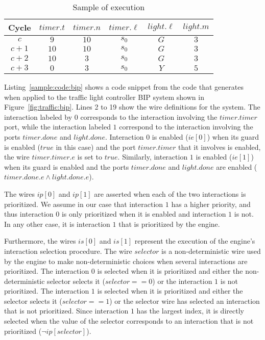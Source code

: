 \begin{table}[bt]
\centering
\caption{Sample of \biptool{} execution}
\begin{tabular}{|c|c|c|c|c|c|}
\hline
Cycle & $timer.t$ & $timer.n$ & $timer.\ell$ & $light.\ell$ & $light.m$ \\ 
\hline
$c$ & $9$ & $10$ & $s_0$ & $G$ & $3$ \\
		\hline
		$c+1$ & $10$ & $10$ & $s_0$ & $G$ & $3$ \\
			\hline
			$c+2$ & $10$ & $3$ & $s_0$ & $G$ & $3$ \\
				\hline
	 $c+3$ & $0$ & $3$ & $s_0$ & $Y$ & $5$ \\
	 \hline
\end{tabular}
\label{tb:bip:exec}
\end{table}

Listing~\ref{sample:code:bip} shows a code snippet from the code that \biptool{} generates
when applied to the traffic light controller BIP system shown in Figure~\ref{fig:traffic:bip}.
Lines 2 to 19 show the wire definitions for the system. The interaction 
labeled by $0$ corresponds to the interaction involving the $timer.timer$
port, while the interaction labeled $1$ correspond to the interaction 
involving the ports $timer.done$ and $light.done$. 
Interaction $0$ is enabled ($ie[0]$) when its guard is enabled ($true$ 
in this case) and the port $timer.timer$ that it involves is enabled, 
\ie{} the wire $timer.timer.e$ is set to $true$. 
Similarly, interaction $1$ is enabled ($ie[1]$) when its guard is
enabled and the ports $timer.done$ and $light.done$ are enabled 
($timer.done.e \land light.done.e$).

The wires $ip[0]$ and $ip[1]$ are asserted when each of the two interactions 
is prioritized. We assume in our case that interaction $1$ has a higher
priority, and thus interaction $0$ is only prioritized when it is enabled
and interaction $1$ is not. In any other case, it is interaction $1$ that
is prioritized by the engine. 

Furthermore, the wires $is[0]$ and $is[1]$ represent the execution of the 
engine's interaction selection procedure. The wire $selector$ is
a non-deterministic wire used by the engine to make non-deterministic
choices when several interactions are prioritized. 
The interaction $0$ is selected
when it is prioritized and either the non-deterministic selector 
selects it ($selector == 0$)
or the interaction $1$ is not prioritized. 
The interaction $1$ is selected when it is prioritized and either 
the selector selects it ($selector == 1$) or the selector wire
has selected an interaction that is not prioritized. Since interaction
$1$ has the largest index, it is
directly selected when the value of the selector corresponds
to an interaction that is not prioritized ($\lnot ip[selector]$).

